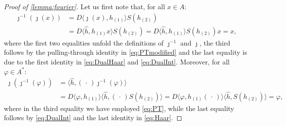 \documentclass[a4paper,10pt]{amsart}
\newcommand{\eval}[2]{\langle #1 , #2\rangle}
\newcommand{\placeholder}{\,\cdot\,}
\theoremstyle{definition}
\begin{document}
\begin{proof}[Proof of \cref{lemma:fourier}]
    Let us first note that, for all $x\in A$:
	\begin{align*}
		\jmath^{-1}(\jmath(x))
		&=
		D \eval{\jmath(x)}{h_{(1)}} S(h_{(2)})
		\\
        &=
		D \eval{\hat{h}}{h_{(1)}x} S(h_{(2)})
		=
		D \eval{\hat{h}}{h_{(1)}} S(h_{(2)}) x
		=
		x,
	\end{align*}
	where the first two equalities unfold the definitions of $\jmath^{-1}$ and $\jmath$, the third follows by the pulling-through identity in \cref{eq:PTmodified} and the last equality is due to the first identity in \cref{eq:DualHaar} and \cref{eq:DualInt}.
    Moreover, for all $\varphi\in A^*$:
	\begin{align*}
		\jmath(\jmath^{-1}(\varphi))
		  & =
		\eval{\hat{h}}{(\placeholder)\jmath^{-1}(\varphi)}
		\\
		  & =
		D  \eval{\varphi}{h_{(1)}} \eval{\hat{h}}{(\placeholder)S(h_{(2)})}
		=
		D \eval{\varphi}{h_{(1)}(\placeholder)}
		\eval{\hat{h}}{S(h_{(2)})}
		=
		\varphi,
	\end{align*}
	where in the third equality we have employed \cref{eq:PT}, while the last equality follows by \cref{eq:DualInt} and the last identity in \cref{eq:Haar}.
\end{proof}
\end{document}
